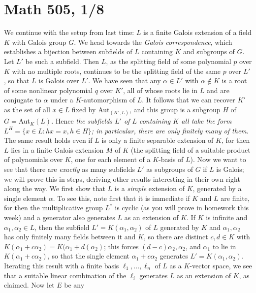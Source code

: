 \documentclass[10pt]{article}
\begin{document}
\section*{Math 505, 1/8}

We continue with the setup from last time: $L$ is a finite Galois
extension of a field $K$ with Galois group $G$. We head towards the {\sl
  Galois correspondence}, which establishes a bijection between
subfields of $L$ containing $K$ and subgroups of $G$. Let $L'$ be such a
subfield. Then $L$, as the splitting field of some polynomial $p$ over
$K$ with no multiple roots, continues to be the splitting field of the
same $p$ over $L'$, so that $L$ is Galois over $L'$. We have seen that
any $\alpha\in L'$ with $\alpha\notin K$ is a root of some nonlinear
polynomial $q$ over $K'$, all of whose roots lie in $L$ and are
conjugate to $\alpha$ under a $K$-automorphism of $L$. It follows that
we can recover $K'$ as the set of all $x\in L$ fixed by Aut$_(K',L)$,
and this group is a subgroup $H$ of $G=$Aut$_K(L)$. Hence {\sl the
  subfields $L'$ of $L$ containing $K$ all take the form $L^H = \{x\in
  L: hx = x, h\in H\}$; in particular, there are only finitely many of
  them}. The same result holds even if $L$ is only a finite separable
extension of $K$, for then $L$ lies in a finite Galois extension $M$ of
$K$ (the splitting field of a suitable product of polynomials over $K$,
one for each element of a $K$-basis of $L$). Now we want to see that
there are {\sl exactly} as many subfields $L'$ as subgroups of $G$ if
$L$ is Galois; we will prove this in steps, deriving other results
interesting in their own right along the way. We first show that $L$ is
a {\sl simple} extension of $K$, generated by a single element $\alpha$.
To see this, note first that it is immediate if $K$ and $L$ are finite,
for then the multiplicative group $L^*$ is cyclic (as you will prove in
homework this week) and a generator also generates $L$ as an extension
of $K$. If $K$ is infinite and $\alpha_1,\alpha_2\in L$, then the
subfield $L'=K(\alpha_1,\alpha_2)$ of $L$ generated by $K$ and
$\alpha_1,\alpha_2$ has only finitely many fields between it and $K$, so
there are distinct $c,d\in K$ with $K(\alpha_1+c\alpha_2) =
K(\alpha_1+d(\alpha_2)$; this forces $(d-c)\alpha_2,\alpha_2$, and
$\alpha_1$ to lie in $K(\alpha_1+c\alpha_2)$, so that the single element
$\alpha_1+c\alpha_2$ generates $L'=K(\alpha_1,\alpha_2)$. Iterating this
result with a finite basis $\ell_1,\ldots,\ell_n$ of $L$ as a $K$-vector
space, we see that a suitable linear combination of the $\ell_i$
generates $L$ as an extension of $K$, as claimed. Now let $E$ be any
\end{document}
